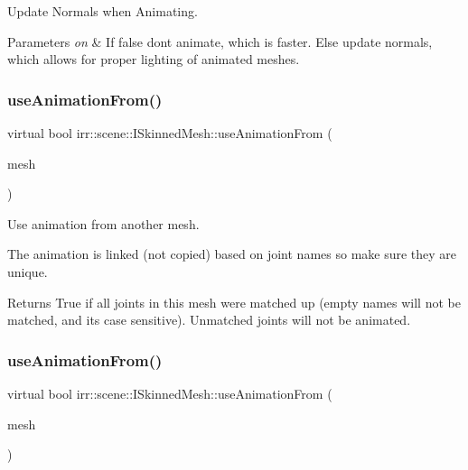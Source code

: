 Update Normals when Animating. 


\begin{DoxyParams}{Parameters}
{\em on} & If false don\textquotesingle{}t animate, which is faster. Else update normals, which allows for proper lighting of animated meshes. \\
\hline
\end{DoxyParams}
\mbox{\label{classirr_1_1scene_1_1ISkinnedMesh_a1d7d56472adeb21aada79c361bf142be}} 
\subsubsection{\texorpdfstring{use\+Animation\+From()}{useAnimationFrom()}\hspace{0.1cm}{\footnotesize\ttfamily [1/2]}}
{\footnotesize\ttfamily virtual bool irr\+::scene\+::\+I\+Skinned\+Mesh\+::use\+Animation\+From (\begin{DoxyParamCaption}\item[{const \hyperlink{classirr_1_1scene_1_1ISkinnedMesh}{I\+Skinned\+Mesh} $\ast$}]{mesh }\end{DoxyParamCaption})\hspace{0.3cm}{\ttfamily [pure virtual]}}



Use animation from another mesh. 

The animation is linked (not copied) based on joint names so make sure they are unique. \begin{DoxyReturn}{Returns}
True if all joints in this mesh were matched up (empty names will not be matched, and it\textquotesingle{}s case sensitive). Unmatched joints will not be animated. 
\end{DoxyReturn}
\mbox{\label{classirr_1_1scene_1_1ISkinnedMesh_a1d7d56472adeb21aada79c361bf142be}} 
\subsubsection{\texorpdfstring{use\+Animation\+From()}{useAnimationFrom()}\hspace{0.1cm}{\footnotesize\ttfamily [2/2]}}
{\footnotesize\ttfamily virtual bool irr\+::scene\+::\+I\+Skinned\+Mesh\+::use\+Animation\+From (\begin{DoxyParamCaption}\item[{const \hyperlink{classirr_1_1scene_1_1ISkinnedMesh}{I\+Skinned\+Mesh} $\ast$}]{mesh }\end{DoxyParamCaption})\hspace{0.3cm}{\ttfamily [pure virtual]}}




